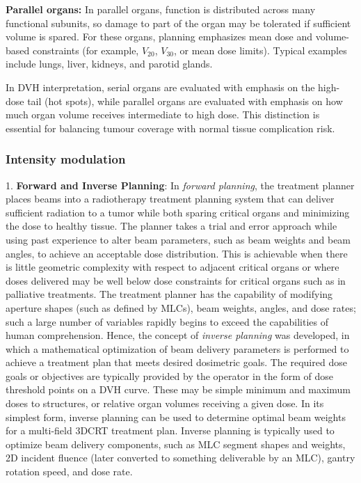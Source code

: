 \textbf{Parallel organs:} In parallel organs, function is distributed across many functional subunits, so damage to part of the organ may be tolerated if sufficient volume is spared. For these organs, planning emphasizes mean dose and volume-based constraints (for example, $V_{20}$, $V_{30}$, or mean dose limits). Typical examples include lungs, liver, kidneys, and parotid glands.

In DVH interpretation, serial organs are evaluated with emphasis on the high-dose tail (hot spots), while parallel organs are evaluated with emphasis on how much organ volume receives intermediate to high dose. This distinction is essential for balancing tumour coverage with normal tissue complication risk.

\subsubsection{Intensity modulation}
1. \textbf{Forward and Inverse Planning}: In \textit{forward planning}, the treatment planner places beams into a radiotherapy treatment planning system that can deliver sufficient radiation to a tumor while both sparing critical organs and minimizing the dose to healthy tissue. The planner takes a trial and error approach while using past experience to alter beam parameters, such as beam weights and beam angles, to achieve an acceptable dose distribution. This is achievable when there is little geometric complexity with respect to adjacent critical organs or where doses delivered may be well below dose constraints for critical organs such as in palliative treatments. The treatment planner has the capability of modifying aperture shapes (such as defined by MLCs), beam weights, angles, and dose rates; such a large number of variables rapidly begins to exceed the capabilities of human comprehension. Hence, the concept of \textit{inverse planning} was developed, in which a mathematical optimization of beam delivery parameters is performed to achieve a treatment plan that meets desired dosimetric goals. The required dose goals or objectives are typically provided by the operator in the form of dose threshold points on a DVH curve. These may be simple minimum and maximum doses to structures, or relative organ volumes receiving a given dose. In its simplest form, inverse planning can be used to determine optimal beam weights for a multi-field 3DCRT treatment plan. Inverse planning is typically used to optimize beam delivery components, such as MLC segment shapes and weights, 2D incident fluence (later converted to something deliverable by an MLC), gantry rotation speed, and dose rate.

